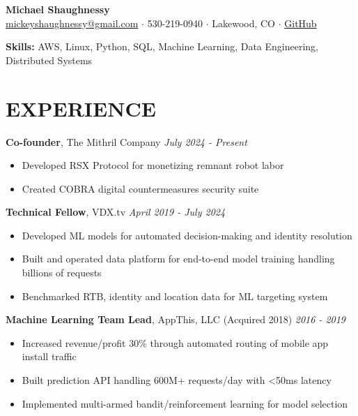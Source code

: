 \documentclass[10pt, letterpaper]{article}
\begin{document}
\begin{center}
{\LARGE \textbf{Michael Shaughnessy}}\\[4pt]
{\color{hyperlinkcolor}\href{mailto:mickeyshaughnessy@gmail.com}{mickeyshaughnessy@gmail.com}} $\cdot$ 
530-219-0940 $\cdot$
Lakewood, CO $\cdot$
{\color{hyperlinkcolor}\href{https://github.com/mickeyshaughnessy}{GitHub}}\\[4pt]
\end{center}

\noindent\textbf{Skills:} AWS, Linux, Python, SQL, Machine Learning, Data Engineering, Distributed Systems

\section{EXPERIENCE}

\noindent\textbf{Co-founder}, {\color{mycolor2}The Mithril Company} \hfill \textit{July 2024 - Present}
\begin{itemize}
\item Developed RSX Protocol for monetizing remnant robot labor
\item Created COBRA digital countermeasures security suite
\end{itemize}

\noindent\textbf{Technical Fellow}, {\color{mycolor2}VDX.tv} \hfill \textit{April 2019 - July 2024}
\begin{itemize}
\item Developed ML models for automated decision-making and identity resolution
\item Built and operated data platform for end-to-end model training handling billions of requests
\item Benchmarked RTB, identity and location data for ML targeting system
\end{itemize}

\noindent\textbf{Machine Learning Team Lead}, {\color{mycolor2}AppThis, LLC} (Acquired 2018) \hfill \textit{2016 - 2019}
\begin{itemize}
\item Increased revenue/profit 30\% through automated routing of mobile app install traffic
\item Built prediction API handling 600M+ requests/day with <50ms latency
\item Implemented multi-armed bandit/reinforcement learning for model selection
\end{itemize}
\end{document}
